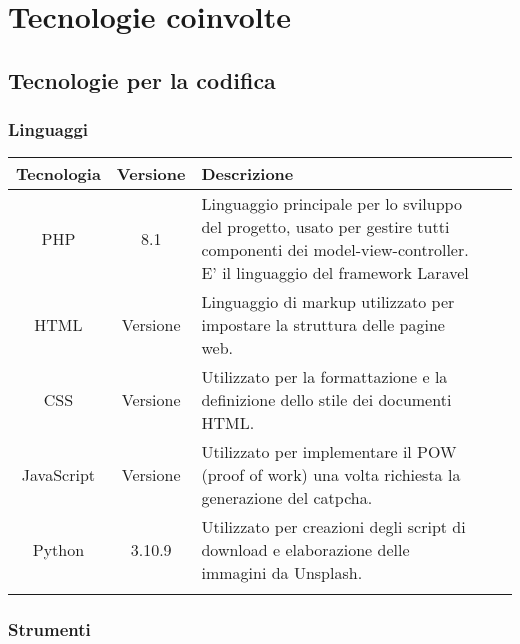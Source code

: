 \section{Tecnologie coinvolte}

\subsection{Tecnologie per la codifica}

\subsubsection{Linguaggi}

\begin{center}
\setlength\extrarowheight{5pt}
\renewcommand\tabularxcolumn[1]{>{\Centering}m{#1}}
\begin{tabularx}{\textwidth}{| c | c | X | X | X |} 
	\hline
	\rowcolor{white}
	\textbf{Tecnologia} & \textbf{Versione} & \textbf{Descrizione}\\
	\hline
	PHP & 8.1 & Linguaggio principale per lo sviluppo del progetto, usato per gestire tutti componenti dei model-view-controller. E' il linguaggio del framework Laravel\\
	\hline
	HTML & Versione & Linguaggio di markup utilizzato per impostare la struttura delle pagine web.\\
	\hline
	CSS & Versione & Utilizzato per la formattazione e la definizione dello stile dei documenti HTML.\\
	\hline
	JavaScript & Versione & Utilizzato per implementare il POW (proof of work) una volta richiesta la generazione del catpcha.\\
	\hline
	Python & 3.10.9 & Utilizzato per creazioni degli script di download e elaborazione delle immagini da Unsplash.\\
	\hline
	\rowcolor{white}
	\caption{Linguaggi utilizzati}
	\end{tabularx}
\end{center}

\subsubsection{Strumenti}

